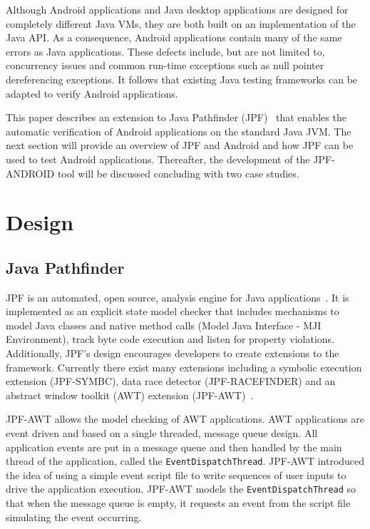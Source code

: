 \documentclass{acm_proc_article-sp}
\begin{document}
Although Android applications and Java desktop applications are designed for completely different Java VMs, they are both built on an
implementation of the Java API. As a consequence, Android applications contain many of the same errors as Java applications. These defects
include, but are not limited to, concurrency issues and common run-time exceptions such as null pointer dereferencing exceptions. It follows that
existing Java testing frameworks can be adapted to verify Android applications.

This paper describes an extension to Java Pathfinder (JPF)~\cite{JPFDocs} that enables the automatic verification of Android applications on
the standard Java JVM. The next section will provide an overview of JPF and Android and how JPF can be used to test Android applications.
Thereafter, the development of the JPF-ANDROID tool will be discussed concluding with two case studies.

\section{Design}
\subsection{Java Pathfinder}
JPF is an automated, open source, analysis engine for Java applications~\cite{JPFDocs}. It is implemented as an explicit state model checker
that includes mechanisms to model Java classes and native method calls (Model Java Interface - MJI Environment), track byte code execution
and listen for property violations. Additionally, JPF's design encourages developers to create extensions to the framework. Currently there
exist many extensions including a symbolic execution extension (JPF-SYMBC), data race
detector (JPF-RACEFINDER) and an abstract window toolkit (AWT) extension (JPF-AWT)~\cite{JPF-AWT}.

JPF-AWT allows the model checking of AWT applications. AWT applications are event driven and based on a single
threaded, message queue design. All application events are put in a message queue and then handled by the main thread of the application,
called the \texttt{EventDispatchThread}. JPF-AWT introduced the idea of using a simple event script file to write sequences of user inputs
to drive the application execution. JPF-AWT models the \texttt{EventDispatchThread} so that when the message queue is empty, it requests an
event from the script file simulating the event occurring. 
\end{document}

